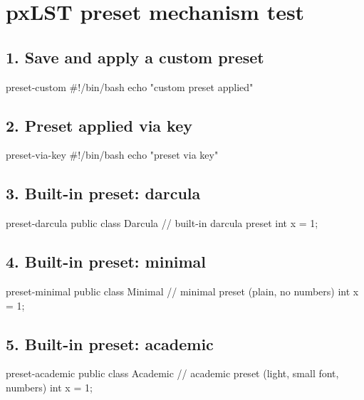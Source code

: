 \documentclass{article}
\begin{document}
\section*{pxLST preset mechanism test}

\subsection*{1. Save and apply a custom preset}
\begin{pxCode}{preset-custom}
#!/bin/bash
echo "custom preset applied"
\end{pxCode}

\subsection*{2. Preset applied via key}
\begin{pxCode}{preset-via-key}
#!/bin/bash
echo "preset via key"
\end{pxCode}

\subsection*{3. Built-in preset: darcula}
\begin{pxCode}{preset-darcula}
public class Darcula {
    // built-in darcula preset
    int x = 1;
}
\end{pxCode}

\subsection*{4. Built-in preset: minimal}
\begin{pxCode}{preset-minimal}
public class Minimal {
    // minimal preset (plain, no numbers)
    int x = 1;
}
\end{pxCode}

\subsection*{5. Built-in preset: academic}
\begin{pxCode}{preset-academic}
public class Academic {
    // academic preset (light, small font, numbers)
    int x = 1;
}
\end{pxCode}
\end{document}
